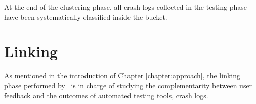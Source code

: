 At the end of the clustering phase, all crash logs collected in the testing phase have been systematically classified inside the bucket. 



\section{Linking}
\label{tool: linking}
As mentioned in the introduction of Chapter \ref{chapter:approach}, the linking phase performed by \toolname\ is in charge of studying the complementarity between user feedback and the outcomes of automated testing tools, \ie crash logs. 



